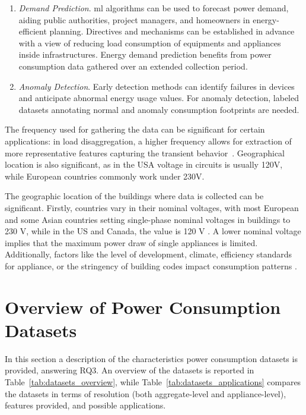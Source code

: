 \begin{enumerate}[label={\textit{A\arabic*.}}, leftmargin=3.5em]
    \item \textit{Demand Prediction}. \acrshort{ml} algorithms can be used to forecast power demand, aiding public authorities, project managers, and homeowners in energy-efficient planning. Directives and mechanisms can be established in advance with a view of reducing load consumption of equipments and appliances inside infrastructures. Energy demand prediction benefits from power consumption data gathered over an extended collection period.

    \item \textit{Anomaly Detection}. Early detection methods can identify failures in devices and anticipate abnormal energy usage values. For anomaly detection, labeled datasets annotating normal and anomaly consumption footprints are needed.
\end{enumerate}

The frequency used for gathering the data can be significant for certain applications: in load disaggregation, a higher frequency allows for extraction of more representative features capturing the transient behavior~\parencite{carrie_armel_is_2013}. Geographical location is also significant, as in the USA voltage in circuits is usually 120V, while European countries commonly work under 230V.

The geographic location of the buildings where data is collected can be significant. Firstly, countries vary in their nominal voltages, with most European and some Asian countries setting single-phase nominal voltages in buildings to 230 V, while in the US and Canada, the value is 120 V \parencite{lee_comparison_2017}. A lower nominal voltage implies that the maximum power draw of single appliances is limited. Additionally, factors like the level of development, climate, efficiency standards for appliance, or the stringency of building codes impact consumption patterns \parencite{berardi_cross-country_2017}.

\section{Overview of Power Consumption Datasets}

In this section a description of the characteristics power consumption datasets is provided, answering RQ3. An overview of the datasets is reported in Table~\ref{tab:datasets_overview}, while Table~\ref{tab:datasets_applications} compares the datasets in terms of resolution (both aggregate-level and appliance-level), features provided, and possible applications.

